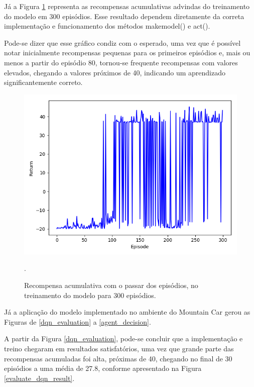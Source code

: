 \documentclass[conference]{IEEEtran}
\begin{document}
	Já a Figura \ref{train/15} representa as recompensas acumulativas advindas do treinamento do modelo em 300 episódios. Esse resultado dependem diretamente da correta implementação e funcionamento dos métodos make\underline{\space}model() e act().
	
	Pode-se dizer que esse gráfico condiz com o esperado, uma vez que é possível notar inicialmente recompensas pequenas para os primeiros episódios e, mais ou menos a partir do episódio 80, tornou-se frequente recompensas com valores elevados, chegando a valores próximos de 40, indicando um aprendizado significantemente correto.

\begin{figure}[htbp]
\centering
\centerline{\includegraphics[scale=0.3]{imagens/train/15.png}}
\caption{Recompensa acumulativa com o passar dos episódios, no treinamento do modelo para 300 episódios.}.
\label{train/15}
\end{figure} 

	Já a aplicação do modelo implementado no ambiente do Mountain Car gerou as Figuras de \ref{dqn_evaluation} a \ref{agent_decision}.
	
	A partir da Figura \ref{dqn_evaluation}, pode-se concluir que a implementação e treino chegaram em resultados satisfatórios, uma vez que grande parte das recompensas acumuladas foi alta, próximas de 40, chegando no final de 30 episódios a uma média de 27.8, conforme apresentado na Figura \ref{evaluate_dqn_result}.
	
\end{document}
